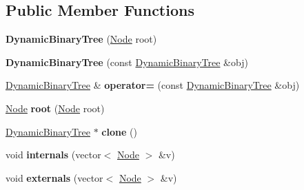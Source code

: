 \subsection*{Public Member Functions}
\begin{DoxyCompactItemize}
\item 
\mbox{\label{classez_1_1trees_1_1DynamicBinaryTree_a13d170a17d9c4102e1b5f379e290945e}} 
{\bfseries Dynamic\+Binary\+Tree} (\hyperlink{classez_1_1trees_1_1DynamicBinaryNode}{Node} root)
\item 
\mbox{\label{classez_1_1trees_1_1DynamicBinaryTree_a6c73288a9c41faa902e53494264eeb70}} 
{\bfseries Dynamic\+Binary\+Tree} (const \hyperlink{classez_1_1trees_1_1DynamicBinaryTree}{Dynamic\+Binary\+Tree} \&obj)
\item 
\mbox{\label{classez_1_1trees_1_1DynamicBinaryTree_a913b32bc9d9fd3e3d1dc1efce492cbee}} 
\hyperlink{classez_1_1trees_1_1DynamicBinaryTree}{Dynamic\+Binary\+Tree} \& {\bfseries operator=} (const \hyperlink{classez_1_1trees_1_1DynamicBinaryTree}{Dynamic\+Binary\+Tree} \&obj)
\item 
\mbox{\label{classez_1_1trees_1_1DynamicBinaryTree_a43bddd6ed670fbee68daba77031a2de0}} 
\hyperlink{classez_1_1trees_1_1DynamicBinaryNode}{Node} {\bfseries root} (\hyperlink{classez_1_1trees_1_1DynamicBinaryNode}{Node} root)
\item 
\mbox{\label{classez_1_1trees_1_1DynamicBinaryTree_aab35fd04ff76684ac5ec9f3510e98ccb}} 
\hyperlink{classez_1_1trees_1_1DynamicBinaryTree}{Dynamic\+Binary\+Tree} $\ast$ {\bfseries clone} ()
\item 
\mbox{\label{classez_1_1trees_1_1DynamicBinaryTree_ae093b35e820a64121edfa4a171f24414}} 
void {\bfseries internals} (vector$<$ \hyperlink{classez_1_1trees_1_1DynamicBinaryNode}{Node} $>$ \&v)
\item 
\mbox{\label{classez_1_1trees_1_1DynamicBinaryTree_a176763055f37802f531152444c6962f9}} 
void {\bfseries externals} (vector$<$ \hyperlink{classez_1_1trees_1_1DynamicBinaryNode}{Node} $>$ \&v)

\end{DoxyCompactItemize}

